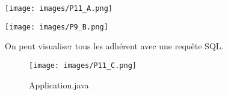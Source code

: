 \documentclass{rapport}
\begin{document}
\begin{minipage}{0.5\textwidth}
\texttt{[image: images/P11\_A.png]}
\label{fig:figure}
\end{minipage}
\hspace{1cm}
\begin{minipage}{0.5\textwidth}
\texttt{[image: images/P9\_B.png]}
\label{fig:figure}
\vspace{1cm}
\end{minipage}

\vspace{1cm}
On peut visualiser tous les adhérent avec une requête SQL. 


\begin{figure}[H]
	\centering
    \texttt{[image: images/P11\_C.png]}
    \caption{Application.java}
\end{figure}
\end{document}

